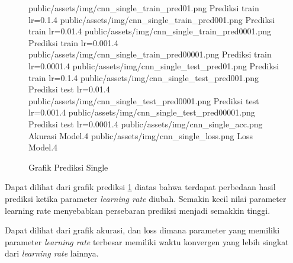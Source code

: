 \documentclass[./skripsi.tex]{subfiles}
\begin{document}
\begin{figure}[H]
\centering
\buatsubgrafik 
{public/assets/img/cnn_single_train_pred01.png}
{Prediksi train lr=0.1}{.4}
\buatsubgrafik 
{public/assets/img/cnn_single_train_pred001.png}
{Prediksi train lr=0.01}{.4}
\buatsubgrafik 
{public/assets/img/cnn_single_train_pred0001.png}
{Prediksi train lr=0.001}{.4}
\buatsubgrafik 
{public/assets/img/cnn_single_train_pred00001.png}
{Prediksi train lr=0.0001}{.4}
\buatsubgrafik 
{public/assets/img/cnn_single_test_pred01.png}
{Prediksi train lr=0.1}{.4}
\buatsubgrafik 
{public/assets/img/cnn_single_test_pred001.png}
{Prediksi test lr=0.01}{.4}
\buatsubgrafik 
{public/assets/img/cnn_single_test_pred0001.png}
{Prediksi test lr=0.001}{.4}
\buatsubgrafik 
{public/assets/img/cnn_single_test_pred00001.png}
{Prediksi test lr=0.0001}{.4}
\buatsubgrafik 
{public/assets/img/cnn_single_acc.png}
{Akurasi Model}{.4}
\buatsubgrafik 
{public/assets/img/cnn_single_loss.png}
{Loss Model}{.4}
\caption{Grafik Prediksi Single}
\label{fig:cnn_single_pred}
\end{figure}
\par Dapat dilihat dari grafik prediksi \ref{fig:cnn_single_pred} diatas bahwa terdapat perbedaan hasil prediksi ketika parameter \textit{learning rate} diubah. Semakin kecil nilai parameter learning rate menyebabkan persebaran prediksi menjadi semakkin tinggi.
\par Dapat dilihat dari grafik akurasi, dan loss dimana parameter yang memiliki parameter \textit{learning rate} terbesar memiliki waktu konvergen yang lebih singkat dari \textit{learning rate} lainnya.
\end{document}
